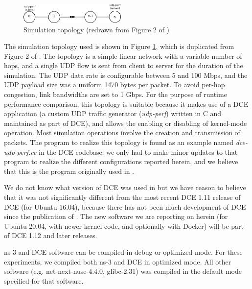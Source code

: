 \documentclass{sig-alternate}
\begin{document}
\begin{figure}[h!]
  \centering
    \includegraphics[width=0.47\textwidth]{figs/topology.png}
  \caption{Simulation topology (redrawn from Figure 2 of \cite{Tazaki13})}
  \label{fig:topology}
\end{figure}

The simulation topology used is shown in Figure \ref{fig:topology}, which
is duplicated from Figure 2 of \cite{Tazaki13}.  The topology is a simple
linear network with a variable number of hops, and a single UDP flow
is sent from client to server for the duration of the simulation.
The UDP data rate is configurable between 5 and 100 Mbps, and the UDP
payload size was a uniform 1470 bytes per packet.
To avoid per-hop congestion, link bandwidths are set to 1 Gbps.
For the purpose of runtime performance comparison, this topology is
suitable because it makes use of a DCE application (a custom UDP traffic
generator (\emph{udp-perf}) written in C and maintained as part of DCE),
and allows the enabling or disabling of kernel-mode operation.  Most
simulation operations involve the creation and transmission of packets.
The program to realize this topology is found as an example named
\emph{dce-udp-perf.cc} in the DCE codebase; we only had to make minor
updates to that program to realize the different configurations reported
herein, and we believe that this is the program originally used
in \cite{Tazaki13}.

We do not know what version of DCE was used in \cite{Tazaki13} but we
have reason to believe that it was not significantly different from the
most recent DCE 1.11 release of DCE (for Ubuntu 16.04), because there
has not been much development of DCE since the publication of \cite{Tazaki13}.
The new software we are reporting on herein (for Ubuntu 20.04, with newer
kernel code, and optionally with Docker) will be part of DCE 1.12 and
later releases.

ns-3 and DCE software can be compiled in debug or optimized mode.  For
these experiments, we compiled both ns-3 and DCE in optimized mode.  All
other software (e.g. net-next-nuse-4.4.0, glibc-2.31) was compiled in
the default mode specified for that software.
\end{document}
